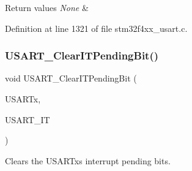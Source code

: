 \begin{DoxyRetVals}{Return values}
{\em None} & \\
\hline
\end{DoxyRetVals}


Definition at line 1321 of file stm32f4xx\+\_\+usart.\+c.

\mbox{\label{group___u_s_a_r_t_ga1fc25d0338695063be5e50156955d9bc}} 
\subsubsection{\texorpdfstring{U\+S\+A\+R\+T\+\_\+\+Clear\+I\+T\+Pending\+Bit()}{USART\_ClearITPendingBit()}}
{\footnotesize\ttfamily void U\+S\+A\+R\+T\+\_\+\+Clear\+I\+T\+Pending\+Bit (\begin{DoxyParamCaption}\item[{\hyperlink{struct_u_s_a_r_t___type_def}{U\+S\+A\+R\+T\+\_\+\+Type\+Def} $\ast$}]{U\+S\+A\+R\+Tx,  }\item[{uint16\+\_\+t}]{U\+S\+A\+R\+T\+\_\+\+IT }\end{DoxyParamCaption})}



Clears the U\+S\+A\+R\+Tx\textquotesingle{}s interrupt pending bits. 


